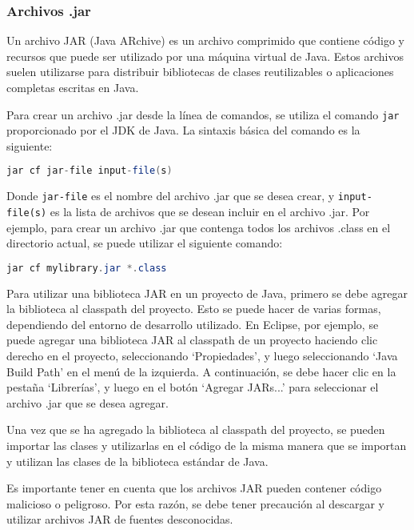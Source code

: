 \documentclass{article}
\begin{document}
\subsubsection*{Archivos .jar}

Un archivo JAR (Java ARchive) es un archivo comprimido que contiene código y recursos que puede ser utilizado por una máquina virtual de Java. Estos archivos suelen utilizarse para distribuir bibliotecas de clases reutilizables o aplicaciones completas escritas en Java.

Para crear un archivo .jar desde la línea de comandos, se utiliza el comando \texttt{jar} proporcionado por el JDK de Java. La sintaxis básica del comando es la siguiente:

\begin{lstlisting}[language=Java]
jar cf jar-file input-file(s)
\end{lstlisting}

Donde \texttt{jar-file} es el nombre del archivo .jar que se desea crear, y \texttt{input-file(s)} es la lista de archivos que se desean incluir en el archivo .jar. Por ejemplo, para crear un archivo .jar que contenga todos los archivos .class en el directorio actual, se puede utilizar el siguiente comando:

\begin{lstlisting}[language=Java]
jar cf mylibrary.jar *.class
\end{lstlisting}

Para utilizar una biblioteca JAR en un proyecto de Java, primero se debe agregar la biblioteca al classpath del proyecto. Esto se puede hacer de varias formas, dependiendo del entorno de desarrollo utilizado. En Eclipse, por ejemplo, se puede agregar una biblioteca JAR al classpath de un proyecto haciendo clic derecho en el proyecto, seleccionando \enquote*{Propiedades}, y luego seleccionando \enquote*{Java Build Path} en el menú de la izquierda. A continuación, se debe hacer clic en la pestaña \enquote*{Librerías}, y luego en el botón \enquote*{Agregar JARs...} para seleccionar el archivo .jar que se desea agregar.

Una vez que se ha agregado la biblioteca al classpath del proyecto, se pueden importar las clases y utilizarlas en el código de la misma manera que se importan y utilizan las clases de la biblioteca estándar de Java.

Es importante tener en cuenta que los archivos JAR pueden contener código malicioso o peligroso. Por esta razón, se debe tener precaución al descargar y utilizar archivos JAR de fuentes desconocidas.
\end{document}
